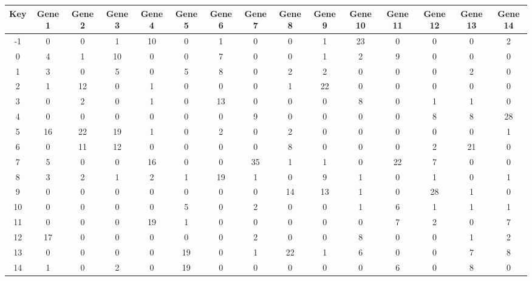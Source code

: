 \begin{tabular}{|c|c|c|c|c|c|c|c|c|c|c|c|c|c|c|}
\hline
Key & Gene 1 & Gene 2 & Gene 3 & Gene 4 & Gene 5 & Gene 6 & Gene 7 & Gene 8 & Gene 9 & Gene 10 & Gene 11 & Gene 12 & Gene 13 & Gene 14 \\
\hline
-1 & 0 & 0 & 1 & 10 & 0 & 1 & 0 & 0 & 1 & 23 & 0 & 0 & 0 & 2 \\
0 & 4 & 1 & 10 & 0 & 0 & 7 & 0 & 0 & 1 & 2 & 9 & 0 & 0 & 0 \\
1 & 3 & 0 & 5 & 0 & 5 & 8 & 0 & 2 & 2 & 0 & 0 & 0 & 2 & 0 \\
2 & 1 & 12 & 0 & 1 & 0 & 0 & 0 & 1 & 22 & 0 & 0 & 0 & 0 & 0 \\
3 & 0 & 2 & 0 & 1 & 0 & 13 & 0 & 0 & 0 & 8 & 0 & 1 & 1 & 0 \\
4 & 0 & 0 & 0 & 0 & 0 & 0 & 9 & 0 & 0 & 0 & 0 & 8 & 8 & 28 \\
5 & 16 & 22 & 19 & 1 & 0 & 2 & 0 & 2 & 0 & 0 & 0 & 0 & 0 & 1 \\
6 & 0 & 11 & 12 & 0 & 0 & 0 & 0 & 8 & 0 & 0 & 0 & 2 & 21 & 0 \\
7 & 5 & 0 & 0 & 16 & 0 & 0 & 35 & 1 & 1 & 0 & 22 & 7 & 0 & 0 \\
8 & 3 & 2 & 1 & 2 & 1 & 19 & 1 & 0 & 9 & 1 & 0 & 1 & 0 & 1 \\
9 & 0 & 0 & 0 & 0 & 0 & 0 & 0 & 14 & 13 & 1 & 0 & 28 & 1 & 0 \\
10 & 0 & 0 & 0 & 0 & 5 & 0 & 2 & 0 & 0 & 1 & 6 & 1 & 1 & 1 \\
11 & 0 & 0 & 0 & 19 & 1 & 0 & 0 & 0 & 0 & 0 & 7 & 2 & 0 & 7 \\
12 & 17 & 0 & 0 & 0 & 0 & 0 & 2 & 0 & 0 & 8 & 0 & 0 & 1 & 2 \\
13 & 0 & 0 & 0 & 0 & 19 & 0 & 1 & 22 & 1 & 6 & 0 & 0 & 7 & 8 \\
14 & 1 & 0 & 2 & 0 & 19 & 0 & 0 & 0 & 0 & 0 & 6 & 0 & 8 & 0 \\
\hline
\end{tabular}